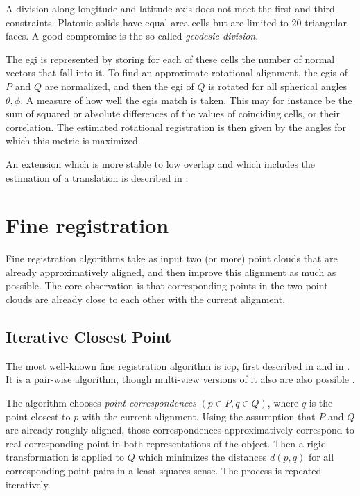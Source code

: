 A division along longitude and latitude axis does not meet the first and third constraints. Platonic solids have equal area cells but are limited to $20$ triangular faces. A good compromise is the so-called \emph{geodesic division}.

The \gls{egi} is represented by storing for each of these cells the number of normal vectors that fall into it. To find an approximate rotational alignment, the \gls{egi}s of $P$ and $Q$ are normalized, and then the \gls{egi} of $Q$ is rotated for all spherical angles $\theta, \phi$. A measure of how well the \gls{egi}s match is taken. This may for instance be the sum of squared or absolute differences of the values of coinciding cells, or their correlation. The estimated rotational registration is then given by the angles for which this metric is maximized.

An extension which is more stable to low overlap and which includes the estimation of a translation is described in \cite{Maka2006}.


\section{Fine registration}
Fine registration algorithms take as input two (or more) point clouds that are already approximatively aligned, and then improve this alignment as much as possible. The core observation is that corresponding points in the two point clouds are already close to each other with the current alignment.

\subsection{Iterative Closest Point} \label{sec:icp}
The most well-known fine registration algorithm is \gls{icp}, first described in \cite{Besl1992} and in \cite{Chen1991}. It is a pair-wise algorithm, though multi-view versions of it also are also possible \cite{Told2010}.

The algorithm chooses \emph{point correspondences} $(p \in P, q \in Q)$, where $q$ is the point closest to $p$ with the current alignment. Using the assumption that $P$ and $Q$ are already roughly aligned, those correspondences approximatively correspond to real corresponding point in both representations of the object. Then a rigid transformation is applied to $Q$ which minimizes the distances $d(p, q)$ for all corresponding point pairs in a least squares sense. The process is repeated iteratively.

